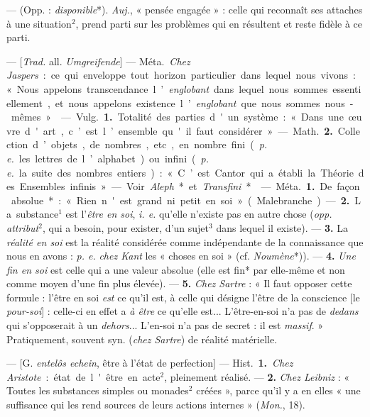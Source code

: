 \begin{itemize}[leftmargin=1cm, label=, itemsep=1pt]
 — (Opp. : {\it disponible}*). {\it Auj.}, « pensée engagée » :
celle qui reconnaît ses attaches à une situation$^2$, prend parti sur les
problèmes qui en résultent et reste fidèle à ce parti.

 — [{\it Trad.} all. {\it Umgreifende}] —
\si{Méta.} {\it Chez Jaspers} : ce qui enveloppe tout horizon particulier
dans lequel nous vivons : « Nous appelons
transcendance l’{\it englobant} dans lequel
nous sommes essentiellement, et
nous appelons existence l’{\it englobant}
que nous sommes nous-mêmes. »

 — \si{Vulg.} {\bf 1.} Totalité des
parties d'un système : « Dans une
œuvre d'art, c’est l’ensemble qu'il
faut considérer ». — \si{Math.} {\bf 2.} Collection d’objets, de nombres,
etc., en nombre fini ({\it p. e.} les lettres de l’alphabet) ou infini
({\it p. e.} la suite des nombres entiers) : « C’est Cantor qui
a établi la Théorie des Ensembles
infinis ». — Voir {\it Aleph}* et {\it Transfini}*.

 — \si{Méta.} {\bf 1.} De façon absolue* :
« Rien n'est grand ni petit en soi »
(Malebranche). — {\bf 2.} La substance$^1$
est l'{\it être en soi}, {\it i. e.} qu’elle n'existe
pas en autre chose ({\it opp.} {\it attribut}$^2$,
qui a besoin, pour exister, d’un
sujet$^3$ dans lequel il existe). — {\bf 3.}
La {\it réalité en soi} est la réalité considérée comme indépendante de la
connaissance que nous en avons :
{\it p. e.} {\it chez Kant} les « choses en soi »
(cf. {\it Noumène}*)). — {\bf 4.} {\it Une fin en soi}
est celle qui a une valeur absolue
(elle est fin* par elle-même et non
comme moyen d’une fin plus élevée).
— {\bf 5.} {\it Chez Sartre} : « Il faut opposer
cette formule : l'être en soi {\it est} ce
qu’il est, à celle qui désigne l'être
de la conscience [le {\it pour-soi}] : celle-ci
en effet a {\it à être} ce qu’elle est... L'être-en-soi n’a pas de
{\it dedans} qui s’opposerait à un {\it dehors}... L'en-soi n’a pas
de secret : il est {\it massif}. » Pratiquement, souvent syn.
({\it chez Sartre}) de réalité matérielle.

 — [G. {\it entelôs echein}, être à
l'état de perfection] — \si{Hist.} {\bf 1.}
{\it Chez Aristote} : état de l'être en
acte$^2$, pleinement réalisé. — {\bf 2.} {\it Chez
Leibniz} : « Toutes les substances
simples ou monades$^2$ créées », parce
qu’il y a en elles « une suffisance
qui les rend sources de leurs actions
internes » ({\it Mon.}, 18).


\end{itemize}
